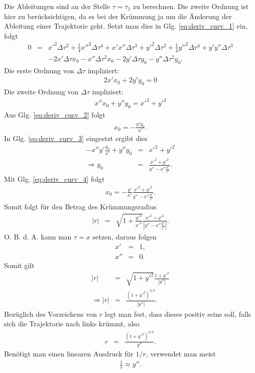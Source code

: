 \documentclass{book}
\begin{document}
%
Die Ableitungen sind an der Stelle $\tau = \tau_1$ zu berechnen. Die zweite Ordnung ist hier zu berücksichtigen, da es bei der Krümmung ja um die Änderung der Ableitung einer Trajektorie geht. Setzt man dies in Glg. \eqref{eq:deriv_curv_1} ein, folgt
%
\begin{eqnarray}
0 & = & x'^2\Delta\tau^2 + \frac{1}{4}x''^2\Delta\tau^4 + x'x''\Delta\tau^3 + y'^2\Delta\tau^2 + \frac{1}{4}y''^2\Delta\tau^4 + y'y''\Delta\tau^3\nonumber\\
&&-2x'\Delta\tau x_0 - x''\Delta\tau^2x_0-2y'\Delta\tau y_0 - y''\Delta\tau^2y_0.
\end{eqnarray}
%
Die erste Ordnung von $\Delta\tau$ impliziert: 
%
\begin{eqnarray}
2x'x_0 + 2y'y_0 = 0\label{eq:deriv_curv_2}
\end{eqnarray}
%
Die zweite Ordnung von $\Delta\tau$ impliziert:
%
\begin{eqnarray}
x''x_0 + y''y_0 = x'^2 + y'^2\label{eq:deriv_curv_3}
\end{eqnarray}
%
Aus Glg. \eqref{eq:deriv_curv_2} folgt
%
\begin{eqnarray}
x_0 = -\frac{y'y_0}{x'}.\label{eq:deriv_curv_4}
\end{eqnarray}
%
In Glg. \eqref{eq:deriv_curv_3} eingestzt ergibt dies
%
\begin{eqnarray}
-x''y'\frac{y_0}{x'} + y''y_0 & = & x'^2 + y'^2\nonumber\\
\Rightarrow y_0 & = & \frac{x'^2 + y'^2}{y''-x''\frac{y'}{x'}}.
\end{eqnarray}
%
Mit Glg. \eqref{eq:deriv_curv_4} folgt
%
\begin{eqnarray}
x_0 = -\frac{y'}{x'}\frac{x'^2 + y'^2}{y''-x''\frac{y'}{x'}}.
\end{eqnarray}
%
Somit folgt für den Betrag des Krümmungsradius
%
\begin{eqnarray}
\left|r\right| & = & \sqrt{1 + \frac{y'^2}{x'^2}}\frac{x'^2+y'^2}{\left|y''-x''\frac{y'}{x'}\right|}.
\end{eqnarray}
%
O. B. d. A. kann man $\tau = x$ setzen, daraus folgen
%
\begin{eqnarray}
x' & = & 1,\\
x'' & = & 0.
\end{eqnarray}
%
Somit gilt
%
\begin{eqnarray}
\left|r\right| & = & \sqrt{1+y'^2}\frac{1+y'^2}{\left|y''\right|}\nonumber\\
\Rightarrow\left|r\right| & = & \frac{\left(1+y'^2\right)^{3/2}}{\left|y''\right|}.
\end{eqnarray}
%
Bezüglich des Vorzeichens von $r$ legt man fest, dass dieses positiv seins soll, falls sich die Trajektorie nach links krümmt, also
%
\begin{eqnarray}
r & = & \frac{\left(1+y'^2\right)^{3/2}}{y''}\label{eq:curv}.
\end{eqnarray}
%
Benötigt man einen linearen Ausdruck für $1/r$, verwendet man meist
%
\begin{eqnarray}
\frac{1}{r} \approx y''\label{eq:curv_approx}.
\end{eqnarray}
%
\end{document}
